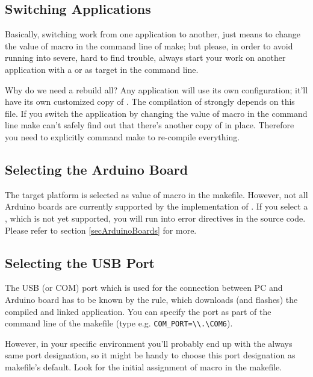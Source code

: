 \subsection{Switching Applications}

Basically, switching work from one application to another, just means to
change the value of macro  in the command line of make; but
please, in order to avoid running into severe, hard to find trouble, always
start your work on another application with a  or
 as target in the command line.

Why do we need a rebuild all? Any \rtos{} application will use its own
configuration; it'll have its own customized copy of
. The compilation of \rtos{} strongly depends on this
file. If you switch the application by changing the value of macro
 in the command line make can't safely find out that there's
another copy of  in place. Therefore you need to
explicitly command make to re-compile everything.


\subsection{Selecting the Arduino Board}

The target platform is selected as value of macro
 in the makefile. However, not all Arduino
boards are currently supported by the implementation of \rtos{}. If you
select a \uC, which is not yet supported, you will run into error
directives in the source code. Please refer to section
\ref{secArduinoBoards} for more.


\subsection{Selecting the USB Port}

The USB (or COM) port which is used for the connection between PC and
Arduino board has to be known by the rule, which downloads (and flashes)
the compiled and linked application. You can specify the port as part of
the command line of the makefile (type e.g. \verb+COM_PORT=\\.\COM6+).

However, in your specific environment you'll probably end up with the
always same port designation, so it might be handy to choose this port
designation as makefile's default. Look for the initial assignment of
macro  in the makefile.


